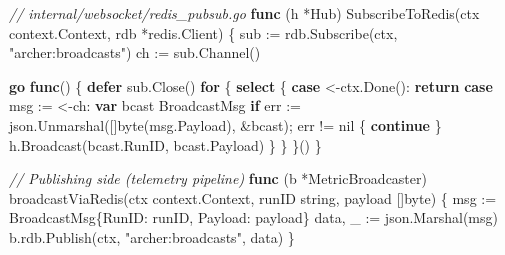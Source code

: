 \documentclass[
]{article}
\newenvironment{Shaded}{}{}
\newcommand{\CommentTok}[1]{\textcolor[rgb]{0.38,0.63,0.69}{\textit{#1}}}
\newcommand{\ControlFlowTok}[1]{\textcolor[rgb]{0.00,0.44,0.13}{\textbf{#1}}}
\newcommand{\DataTypeTok}[1]{\textcolor[rgb]{0.56,0.13,0.00}{#1}}
\newcommand{\KeywordTok}[1]{\textcolor[rgb]{0.00,0.44,0.13}{\textbf{#1}}}
\newcommand{\NormalTok}[1]{#1}
\newcommand{\OperatorTok}[1]{\textcolor[rgb]{0.40,0.40,0.40}{#1}}
\newcommand{\OtherTok}[1]{\textcolor[rgb]{0.00,0.44,0.13}{#1}}
\newcommand{\StringTok}[1]{\textcolor[rgb]{0.25,0.44,0.63}{#1}}
\begin{document}
\begin{Shaded}
\begin{Highlighting}[]
\CommentTok{// internal/websocket/redis\_pubsub.go}
\KeywordTok{func} \OperatorTok{(}\NormalTok{h }\OperatorTok{*}\NormalTok{Hub}\OperatorTok{)}\NormalTok{ SubscribeToRedis}\OperatorTok{(}\NormalTok{ctx context}\OperatorTok{.}\NormalTok{Context}\OperatorTok{,}\NormalTok{ rdb }\OperatorTok{*}\NormalTok{redis}\OperatorTok{.}\NormalTok{Client}\OperatorTok{)} \OperatorTok{\{}
\NormalTok{    sub }\OperatorTok{:=}\NormalTok{ rdb}\OperatorTok{.}\NormalTok{Subscribe}\OperatorTok{(}\NormalTok{ctx}\OperatorTok{,} \StringTok{"archer:broadcasts"}\OperatorTok{)}
\NormalTok{    ch }\OperatorTok{:=}\NormalTok{ sub}\OperatorTok{.}\NormalTok{Channel}\OperatorTok{()}

    \ControlFlowTok{go} \KeywordTok{func}\OperatorTok{()} \OperatorTok{\{}
        \ControlFlowTok{defer}\NormalTok{ sub}\OperatorTok{.}\NormalTok{Close}\OperatorTok{()}
        \ControlFlowTok{for} \OperatorTok{\{}
            \ControlFlowTok{select} \OperatorTok{\{}
            \ControlFlowTok{case} \OperatorTok{\textless{}{-}}\NormalTok{ctx}\OperatorTok{.}\NormalTok{Done}\OperatorTok{():}
                \ControlFlowTok{return}
            \ControlFlowTok{case}\NormalTok{ msg }\OperatorTok{:=} \OperatorTok{\textless{}{-}}\NormalTok{ch}\OperatorTok{:}
                \KeywordTok{var}\NormalTok{ bcast BroadcastMsg}
                \ControlFlowTok{if}\NormalTok{ err }\OperatorTok{:=}\NormalTok{ json}\OperatorTok{.}\NormalTok{Unmarshal}\OperatorTok{([]}\DataTypeTok{byte}\OperatorTok{(}\NormalTok{msg}\OperatorTok{.}\NormalTok{Payload}\OperatorTok{),} \OperatorTok{\&}\NormalTok{bcast}\OperatorTok{);}\NormalTok{ err }\OperatorTok{!=} \OtherTok{nil} \OperatorTok{\{}
                    \ControlFlowTok{continue}
                \OperatorTok{\}}
\NormalTok{                h}\OperatorTok{.}\NormalTok{Broadcast}\OperatorTok{(}\NormalTok{bcast}\OperatorTok{.}\NormalTok{RunID}\OperatorTok{,}\NormalTok{ bcast}\OperatorTok{.}\NormalTok{Payload}\OperatorTok{)}
            \OperatorTok{\}}
        \OperatorTok{\}}
    \OperatorTok{\}()}
\OperatorTok{\}}

\CommentTok{// Publishing side (telemetry pipeline)}
\KeywordTok{func} \OperatorTok{(}\NormalTok{b }\OperatorTok{*}\NormalTok{MetricBroadcaster}\OperatorTok{)}\NormalTok{ broadcastViaRedis}\OperatorTok{(}\NormalTok{ctx context}\OperatorTok{.}\NormalTok{Context}\OperatorTok{,}\NormalTok{ runID }\DataTypeTok{string}\OperatorTok{,}\NormalTok{ payload }\OperatorTok{[]}\DataTypeTok{byte}\OperatorTok{)} \OperatorTok{\{}
\NormalTok{    msg }\OperatorTok{:=}\NormalTok{ BroadcastMsg}\OperatorTok{\{}\NormalTok{RunID}\OperatorTok{:}\NormalTok{ runID}\OperatorTok{,}\NormalTok{ Payload}\OperatorTok{:}\NormalTok{ payload}\OperatorTok{\}}
\NormalTok{    data}\OperatorTok{,}\NormalTok{ \_ }\OperatorTok{:=}\NormalTok{ json}\OperatorTok{.}\NormalTok{Marshal}\OperatorTok{(}\NormalTok{msg}\OperatorTok{)}
\NormalTok{    b}\OperatorTok{.}\NormalTok{rdb}\OperatorTok{.}\NormalTok{Publish}\OperatorTok{(}\NormalTok{ctx}\OperatorTok{,} \StringTok{"archer:broadcasts"}\OperatorTok{,}\NormalTok{ data}\OperatorTok{)}
\OperatorTok{\}}
\end{Highlighting}
\end{Shaded}
\end{document}
